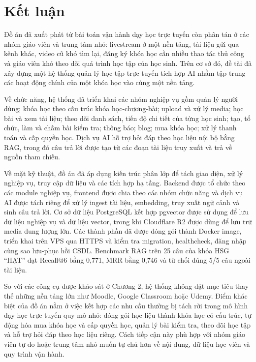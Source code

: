 \documentclass[../DoAn.tex]{subfiles}
\begin{document}
\section{Kết luận}

Đồ án đã xuất phát từ bài toán vận hành dạy học trực tuyến còn phân tán ở các nhóm giáo viên và trung tâm nhỏ: livestream ở một nền tảng, tài liệu gửi qua kênh khác, video cũ khó tìm lại, đăng ký khóa học cần nhiều thao tác thủ công và giáo viên khó theo dõi quá trình học tập của học sinh. Trên cơ sở đó, đề tài đã xây dựng một hệ thống quản lý học tập trực tuyến tích hợp AI nhằm tập trung các hoạt động chính của một khóa học vào cùng một nền tảng.

Về chức năng, hệ thống đã triển khai các nhóm nghiệp vụ gồm quản lý người dùng; khóa học theo cấu trúc khóa học-chương-bài; upload và xử lý media; học bài và xem tài liệu; theo dõi danh sách, tiến độ chi tiết của từng học sinh; tạo, tổ chức, làm và chấm bài kiểm tra; thông báo; blog; mua khóa học; xử lý thanh toán và cấp quyền học. Dịch vụ AI hỗ trợ hỏi đáp theo học liệu nội bộ bằng RAG, trong đó câu trả lời được tạo từ các đoạn tài liệu truy xuất và trả về nguồn tham chiếu.

Về mặt kỹ thuật, đồ án đã áp dụng kiến trúc phân lớp để tách giao diện, xử lý nghiệp vụ, truy cập dữ liệu và các tích hợp hạ tầng. Backend được tổ chức theo các module nghiệp vụ, frontend được chia theo các nhóm chức năng và dịch vụ AI được tách riêng để xử lý ingest tài liệu, embedding, truy xuất ngữ cảnh và sinh câu trả lời. Cơ sở dữ liệu PostgreSQL kết hợp pgvector được sử dụng để lưu dữ liệu nghiệp vụ và dữ liệu vector, trong khi Cloudflare R2 được dùng để lưu trữ media dung lượng lớn. Các thành phần đã được đóng gói thành Docker image, triển khai trên VPS qua HTTPS và kiểm tra migration, healthcheck, đăng nhập cùng sao lưu-phục hồi CSDL. Benchmark RAG trên 25 câu của khóa HSG ``HẠT'' đạt Recall@6 bằng 0,771, MRR bằng 0,746 và từ chối đúng 5/5 câu ngoài tài liệu.

So với các công cụ được khảo sát ở Chương 2, hệ thống không đặt mục tiêu thay thế những nền tảng lớn như Moodle, Google Classroom hoặc Udemy. Điểm khác biệt của đồ án nằm ở việc kết hợp các nhu cầu thường bị tách rời trong mô hình dạy học trực tuyến quy mô nhỏ: đóng gói học liệu thành khóa học có cấu trúc, tự động hóa mua khóa học và cấp quyền học, quản lý bài kiểm tra, theo dõi học tập và hỗ trợ hỏi đáp theo học liệu riêng. Cách tiếp cận này phù hợp với nhóm giáo viên tự do hoặc trung tâm nhỏ muốn tự chủ hơn về nội dung, dữ liệu học viên và quy trình vận hành.
\end{document}
